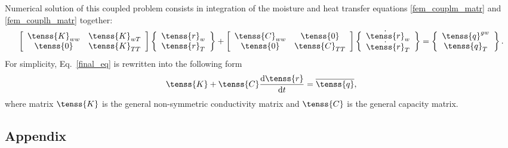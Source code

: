Numerical solution of this coupled problem consists in integration of
the moisture and heat transfer equations \eqref{fem_couplm_matr} and \eqref{fem_couplh_matr} together:
\begin{eqnarray}\label{final_eq}
\left[ \begin{array}{cc}
\tenss{K}_{ww} & \tenss{K}_{wT} \\
\tenss{0} & \tenss{K}_{TT}
\end{array} \right]
\left\{ \begin{array}{c}
\tenss{r}_w \\
\tenss{r}_{T}
\end{array} \right\} + 
\left[ \begin{array}{cc}
\tenss{C}_{ww} & \tenss{0} \\
\tenss{0} & \tenss{C}_{TT}
\end{array} \right]
\left\{ \begin{array}{c}
\dot{\tenss{r}}_w \\
\dot{\tenss{r}}_{T}
\end{array} \right\} = 
\left\{ \begin{array}{c}
\tenss{q}^{gw} \\
\tenss{q}_{T}
\end{array} \right\}.
\end{eqnarray}
For simplicity, Eq.~\eqref{final_eq} is rewritten into the following form
\begin{eqnarray}\label{final_eq_short}
\tenss{K} + \tenss{C}\frac{{\rm d}\tenss{r}}{{\rm d} t} = \overline{\tenss{q}},
\end{eqnarray}
where matrix $\tenss{K}$ is the general non-symmetric conductivity matrix and $\tenss{C}$ is the general capacity matrix.

\newpage
\subsection{Appendix}

